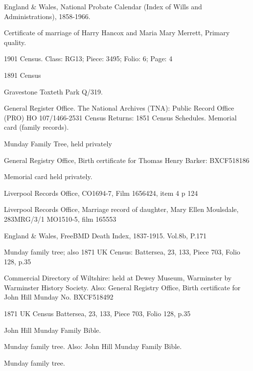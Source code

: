 \begin{thebibliography}{99}
	England \& Wales, National Probate Calendar (Index of Wills and Administrations), 1858-1966.
	
	Certificate of marriage of Harry Hancox and Maria Mary Merrett, Primary quality.
	
	1901 Census.
	Class: RG13; Piece: 3495; Folio: 6; Page: 4
	
	1891 Census
	
	Gravestone Toxteth Park Q/319. 
	
	General Register Office. The National Archives (TNA): Public Record Office (PRO) HO 107/1466-2531 Census Returns: 1851 Census Schedules.
	Memorial card (family records). 
	
	Munday Family Tree, held privately

	 General Registry Office, Birth certificate for Thomas Henry Barker: BXCF518186
	 
	 Memorial card held privately.
	 
	Liverpool Records Office, CO1694-7, Film 1656424, item 4 p 124

	Liverpool Records Office, Marriage record of daughter, Mary Ellen Moulsdale, 283MRG/3/1 MO1510-5, film 165553

	England \& Wales, FreeBMD Death Index, 1837-1915. Vol.8b, P.171
	
	Munday family tree; also
	1871 UK Census: Battersea, 23, 133, Piece 703, Folio 128, p.35 
	
	Commercial Directory of Wiltshire: held at Dewey Museum, Warminster by Warminster History Society.
	Also: General Registry Office, Birth certificate for John Hill Munday No. BXCF518492
	
	1871 UK Census
	Battersea, 23, 133, Piece 703, Folio 128, p.35
	
	John Hill Munday Family Bible.
	
	Munday family tree. Also:
	John Hill Munday Family Bible. 
	
	Munday family tree. 
	

\end{thebibliography}
